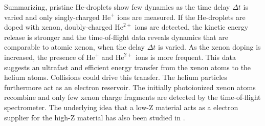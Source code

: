 Summarizing, pristine He-droplets show few dynamics as the time delay $\Delta t$ is varied and only singly-charged $\text{He}^{+}$ ions are measured. If the He-droplets are doped with xenon, doubly-charged $\text{He}^{2+}$ ions are detected, the kinetic energy release is stronger and the time-of-flight data reveals dynamics that are comparable to atomic xenon, when the delay $\Delta t$ is varied. As the xenon doping is increased, the presence of $\text{He}^{+}$ and $\text{He}^{2+}$ ions is more frequent. This data suggests an ultrafast and efficient energy transfer from the xenon atoms to the helium atoms. Collisions could drive this transfer. The helium particles furthermore act as an electron reservoir. The initially photoionized xenon atoms recombine and only few xenon charge fragments are detected by the time-of-flight spectrometer. The underlying idea that a low-Z material acts as a electron supplier for the high-Z material has also been studied in \citep{Hoener-2008-JPB}.
%
%
%
